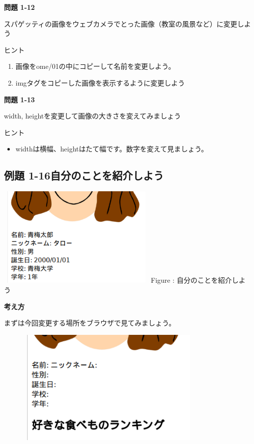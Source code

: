 \documentclass[a4paper,12pt]{jarticle}
\begin{document}
{\bfseries
  問題 1-12}

スパゲッティの画像をウェブカメラでとった画像（教室の風景など）に変更しよう

ヒント

\begin{enumerate}
  \item
        画像をome/01の中にコピーして名前を変更しよう。
  \item
        imgタグをコピーした画像を表示するように変更しよう
\end{enumerate}
{\bfseries
問題 1-13}

width,
heightを変更して画像の大きさを変えてみましょう

ヒント

\begin{itemize}
  \item
        widthは横幅、heightはたて幅です。数字を変えて見ましょう。
\end{itemize}


\clearpage\subsection{例題 1-16自分のことを紹介しよう}
\centering
\begin{minipage}{7.788cm}
  \includegraphics[width=7.788cm,height=4.927cm]{textbook-img173.png}
  \newline
  Figure : 自分のことを紹介しよう
\end{minipage}

\bigskip

\flushleft

\textbf{考え方}


\bigskip

まずは今回変更する場所をブラウザで見てみましょう。

\centering
\includegraphics[width=11.28cm,height=5.667cm]{textbook-img175.png}
\end{document}
